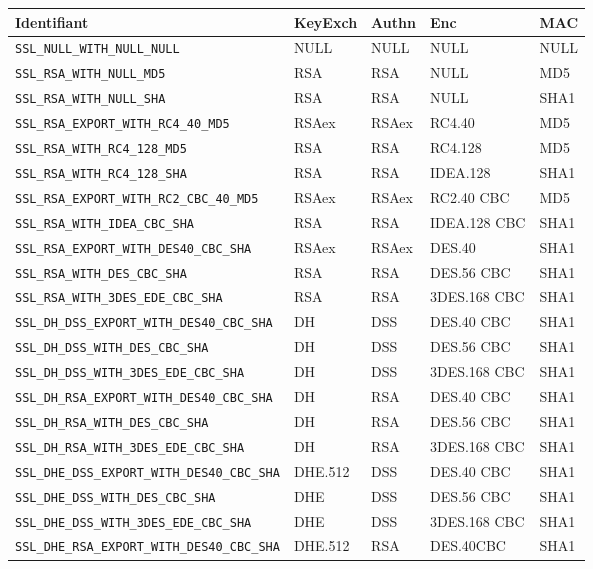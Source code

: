 \begin{table}[H]
\centering
\begin{tabularx}{17cm}{|l|l|l|X|l|}
\hline
\textbf{Identifiant} & \textbf{KeyExch} & \textbf{Authn}& \textbf{Enc}& \textbf{MAC}\\
\hline
\verb+SSL_NULL_WITH_NULL_NULL+&NULL&NULL&NULL&NULL\\
\hline
\verb+SSL_RSA_WITH_NULL_MD5+&RSA&RSA&NULL&MD5\\
\hline 
\verb+SSL_RSA_WITH_NULL_SHA+&RSA&RSA&NULL&SHA1\\
\hline 
\verb+SSL_RSA_EXPORT_WITH_RC4_40_MD5+&RSAex&RSAex&RC4.40&MD5\\
\hline
\verb+SSL_RSA_WITH_RC4_128_MD5+&RSA&RSA&RC4.128&MD5\\
\hline
\verb+SSL_RSA_WITH_RC4_128_SHA+ &RSA&RSA&IDEA.128&SHA1\\
\hline
\verb+SSL_RSA_EXPORT_WITH_RC2_CBC_40_MD5+&RSAex&RSAex&RC2.40 CBC&MD5 \\
\hline
\verb+SSL_RSA_WITH_IDEA_CBC_SHA+& RSA&RSA&IDEA.128 CBC&SHA1\\
\hline
\verb+SSL_RSA_EXPORT_WITH_DES40_CBC_SHA+&RSAex&RSAex&DES.40&SHA1\\
\hline
\verb+SSL_RSA_WITH_DES_CBC_SHA+& RSA&RSA&DES.56 CBC&SHA1\\
\hline
\verb+SSL_RSA_WITH_3DES_EDE_CBC_SHA+& RSA&RSA&3DES.168 CBC&SHA1\\
\hline
\verb+SSL_DH_DSS_EXPORT_WITH_DES40_CBC_SHA+&DH&DSS&DES.40 CBC&SHA1\\
\hline
\verb+SSL_DH_DSS_WITH_DES_CBC_SHA+ & DH&DSS&DES.56 CBC&SHA1\\
\hline 
\verb+SSL_DH_DSS_WITH_3DES_EDE_CBC_SHA+ & DH&DSS&3DES.168 CBC&SHA1\\
\hline
\verb+SSL_DH_RSA_EXPORT_WITH_DES40_CBC_SHA+ & DH&RSA&DES.40 CBC&SHA1\\
\hline
\verb+SSL_DH_RSA_WITH_DES_CBC_SHA+ & DH&RSA&DES.56 CBC&SHA1\\
\hline
\verb+SSL_DH_RSA_WITH_3DES_EDE_CBC_SHA+ & DH&RSA&3DES.168 CBC&SHA1\\
\hline
\verb+SSL_DHE_DSS_EXPORT_WITH_DES40_CBC_SHA+ & DHE.512&DSS&DES.40 CBC&SHA1\\
\hline
\verb+SSL_DHE_DSS_WITH_DES_CBC_SHA+ & DHE&DSS&DES.56 CBC&SHA1\\
\hline
\verb+SSL_DHE_DSS_WITH_3DES_EDE_CBC_SHA+ & DHE&DSS&3DES.168 CBC&SHA1\\
\hline
\verb+SSL_DHE_RSA_EXPORT_WITH_DES40_CBC_SHA+ & DHE.512&RSA&DES.40CBC&SHA1\\

\end{tabularx}
\end{table}

